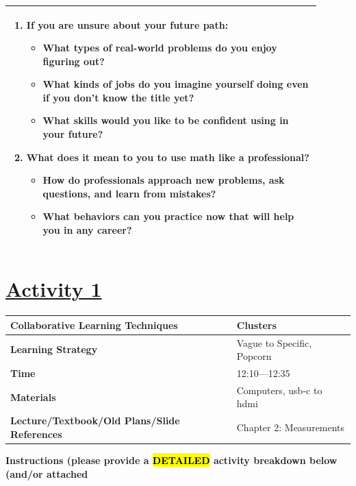 \documentclass{article}
\begin{document}
\begin{tabular}{|p{0.9\linewidth}|}
\begin{enumerate}
\begin{itemize}
    \end{itemize}
    \item If you are unsure about your future path:
    \begin{itemize}
        \item What types of real-world problems do you enjoy figuring out?
        \item What kinds of jobs do you imagine yourself doing even if you don’t know the title yet?
        \item What skills would you like to be confident using in your future?
    \end{itemize}
    \item What does it mean to you to use math like a professional?
    \begin{itemize}
        \item How do professionals approach new problems, ask questions, and learn from mistakes?
        \item What behaviors can you practice now that will help you in any career?
    \end{itemize}
\end{enumerate} \\
\hline
\end{tabular}










\newpage
\noindent
\section*{\underline{Activity 1}}
\begin{tabular}{|p{4.2cm}|p{9.8cm}|}
\hline
\textbf{Collaborative Learning Techniques} & Clusters \\
\hline
\textbf{Learning Strategy} & Vague to Specific, Popcorn \\
\hline
\textbf{Time} & 12:10---12:35 \\
\hline
\textbf{Materials} & Computers, usb-c to hdmi \\
\hline
\textbf{Lecture/Textbook/Old Plans/Slide References} & Chapter 2: Measurements \\
\hline
\end{tabular}

\vspace{0.5cm}

\noindent
{\large \textbf{Instructions (please provide a \hl{DETAILED} activity breakdown below (and/or attached}} \\
\end{document}
